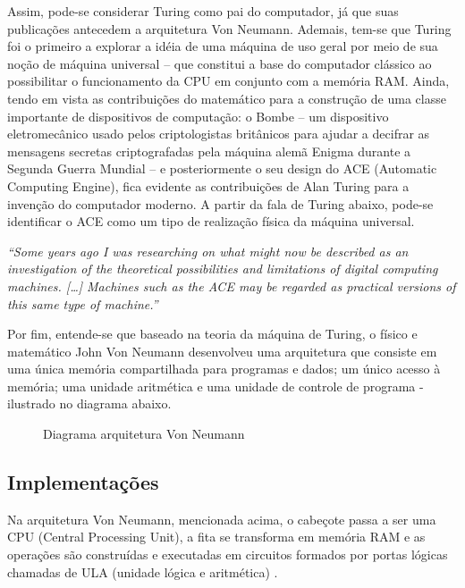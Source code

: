 Assim, pode-se considerar Turing como pai do computador, já que suas publicações antecedem a arquitetura Von Neumann. Ademais, tem-se que Turing foi o primeiro a explorar a idéia de uma máquina de uso geral por meio de sua noção de máquina universal – que constitui a base do computador clássico ao possibilitar o funcionamento da CPU em conjunto com a memória RAM. Ainda, tendo em vista as contribuições do matemático para a construção de uma classe importante de dispositivos de computação: o Bombe – um dispositivo eletromecânico usado pelos criptologistas britânicos para ajudar a decifrar as mensagens secretas criptografadas pela máquina alemã Enigma durante a Segunda Guerra Mundial – e posteriormente o seu design do ACE (Automatic Computing Engine), fica evidente as contribuições de Alan Turing para a invenção do computador moderno. A partir da fala de Turing abaixo, pode-se identificar o ACE como um tipo de realização física da máquina universal.

\textit{
  ``Some years ago I was researching on what might now be described as an investigation of the theoretical possibilities and limitations of digital computing machines. […] Machines such as the ACE may be regarded as practical versions of this same type of machine.'' \cite{11}
}

Por fim, entende-se que baseado na teoria da máquina de Turing, o físico e matemático John Von Neumann desenvolveu uma arquitetura que consiste em uma única memória compartilhada para programas e dados; um único acesso à memória; uma unidade aritmética e uma unidade de controle de programa - ilustrado no diagrama abaixo.

\vspace{1cm}
\begin{figure}[H] \centering 
  \caption{\label{von_neumann_architecture} Diagrama arquitetura Von Neumann} 
\end{figure}

\subsection{Implementações}

Na arquitetura Von Neumann, mencionada acima, o cabeçote passa a ser uma CPU (Central Processing Unit), a fita se transforma em memória RAM e as operações são construídas e executadas em circuitos formados por portas lógicas chamadas de ULA (unidade lógica e aritmética) \cite{12}.

